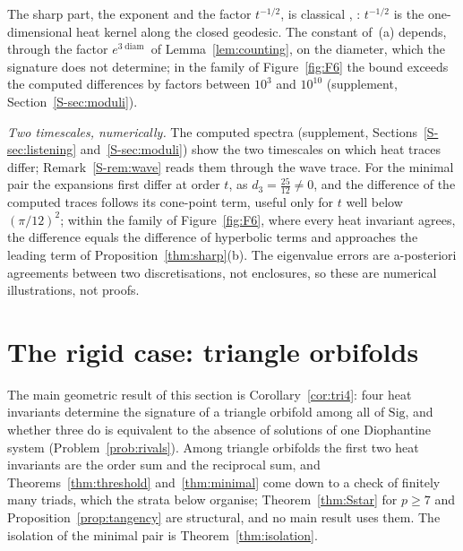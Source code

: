 \documentclass[pdflatex,sn-mathphys-num]{sn-jnl}
\theoremstyle{thmstyleone}%
\theoremstyle{thmstylethree}%
\newcommand{\Sig}{\mathrm{Sig}}
\newcommand{\diam}{\operatorname{diam}}
\newcommand{\sref}[1]{\ref*{S-#1}}%
\begin{document}
The sharp part, the exponent and the factor $t^{-1/2}$, is classical \cite{huber1959,mckean1972}, \cite[proof of Thm~4.5]{dryden2004}: $t^{-1/2}$ is the one-dimensional heat kernel along the closed geodesic. The constant of~(a) depends, through the factor $e^{3\diam}$ of Lemma~\ref{lem:counting}, on the diameter, which the signature does not determine; in the family of Figure~\ref{fig:F6} the bound exceeds the computed differences by factors between $10^3$ and $10^{10}$ (supplement, Section~\sref{sec:moduli}).



\emph{Two timescales, numerically.} The computed spectra (supplement, Sections~\sref{sec:listening} and~\sref{sec:moduli}) show the two timescales on which heat traces differ; Remark~\sref{rem:wave} reads them through the wave trace. For the minimal pair the expansions first differ at order $t$, as $d_3=\frac{25}{12}\ne0$, and the difference of the computed traces follows its cone-point term, useful only for $t$ well below $(\pi/12)^2$; within the family of Figure~\ref{fig:F6}, where every heat invariant agrees, the difference equals the difference of hyperbolic terms and approaches the leading term of Proposition~\ref{thm:sharp}(b). The eigenvalue errors are a-posteriori agreements between two discretisations, not enclosures, so these are numerical illustrations, not proofs.

\section{The rigid case: triangle orbifolds}\label{sec:rigid}

The main geometric result of this section is Corollary~\ref{cor:tri4}: four heat invariants determine the signature of a triangle orbifold among all of $\Sig$, and whether three do is equivalent to the absence of solutions of one Diophantine system (Problem~\ref{prob:rivals}). Among triangle orbifolds the first two heat invariants are the order sum and the reciprocal sum, and Theorems~\ref{thm:threshold} and~\ref{thm:minimal} come down to a check of finitely many triads, which the strata below organise; Theorem~\ref{thm:Sstar} for $p\ge7$ and Proposition~\ref{prop:tangency} are structural, and no main result uses them. The isolation of the minimal pair is Theorem~\ref{thm:isolation}.
\end{document}
